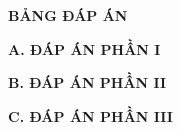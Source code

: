 \documentclass[12pt,a4paper]{article}
\begin{document}
\begin{center}
\textbf{\large BẢNG ĐÁP ÁN}
\end{center}
\noindent\textbf{A. ĐÁP ÁN PHẦN I}
	
\noindent\textbf{B. ĐÁP ÁN PHẦN II}
	
\noindent\textbf{C. ĐÁP ÁN PHẦN III}
\end{document}
